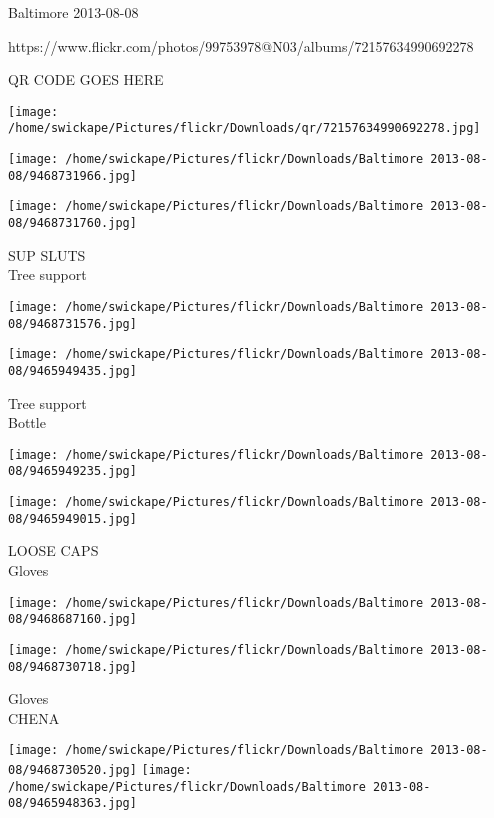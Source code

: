 \documentclass[10pt,letterpaper]{article}
\begin{document}
Baltimore 2013-08-08

https://www.flickr.com/photos/99753978@N03/albums/72157634990692278

QR CODE GOES HERE

\texttt{[image: /home/swickape/Pictures/flickr/Downloads/qr/72157634990692278.jpg]}
\pagebreak

\texttt{[image: /home/swickape/Pictures/flickr/Downloads/Baltimore 2013-08-08/9468731966.jpg]}

\vspace{0.25in}
\texttt{[image: /home/swickape/Pictures/flickr/Downloads/Baltimore 2013-08-08/9468731760.jpg]}

SUP SLUTS\\
Tree support\\
\pagebreak

\texttt{[image: /home/swickape/Pictures/flickr/Downloads/Baltimore 2013-08-08/9468731576.jpg]}

\vspace{0.25in}
\texttt{[image: /home/swickape/Pictures/flickr/Downloads/Baltimore 2013-08-08/9465949435.jpg]}

Tree support\\
Bottle\\
\pagebreak

\texttt{[image: /home/swickape/Pictures/flickr/Downloads/Baltimore 2013-08-08/9465949235.jpg]}

\vspace{0.25in}
\texttt{[image: /home/swickape/Pictures/flickr/Downloads/Baltimore 2013-08-08/9465949015.jpg]}

LOOSE CAPS\\
Gloves\\
\pagebreak

\texttt{[image: /home/swickape/Pictures/flickr/Downloads/Baltimore 2013-08-08/9468687160.jpg]}

\vspace{0.25in}
\texttt{[image: /home/swickape/Pictures/flickr/Downloads/Baltimore 2013-08-08/9468730718.jpg]}

Gloves\\
CHENA\\
\pagebreak

\texttt{[image: /home/swickape/Pictures/flickr/Downloads/Baltimore 2013-08-08/9468730520.jpg]}
\texttt{[image: /home/swickape/Pictures/flickr/Downloads/Baltimore 2013-08-08/9465948363.jpg]}
\end{document}
